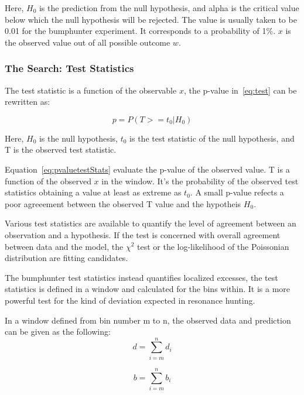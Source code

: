 Here, $H_0$ is the prediction from the null hypothesis, and alpha is the critical value below which the null hypothesis will be rejected. The value is usually taken to be 0.01 for the bumphunter experiment. It corresponds to a probability of 1\%. $x$ is the observed value out of all possible outcome $w$.  

\subsubsection{The Search: Test Statistics}
\label{teststatistics}

The test statistic is a function of the observable $x$, the p-value in~\ref{eq:test} can be rewritten as:
    
\begin{equation}
    p = P(T>=t_{0}| H_{0})
\label{eq:pvaluetestStats}
\end{equation}

Here, $H_0$ is the null hypothesis, $t_0$ is the test statistic of the null hypothesis, and T is the observed test statistic.

Equation~\ref{eq:pvaluetestStats} evaluate the p-value of the observed value. T is a function of the observed $x$ in the window. It's the probability of the observed test statistics obtaining a value at least as extreme as $t_{0}$. A small p-value refects a poor agreeement between the observed T value and the hypotheis $H_{0}$.

Various test statistics are available to quantify the level of agreement between an observation and a hypothesis. If the test is concerned with overall agreement between data and the model, the $\chi^{2}$ test or the log-likelihood of the Poissonian distribution are fitting candidates.

The bumphunter test statistics instead quantifies localized excesses, the test statistics is defined in a window and calculated for the bins within. It is a more powerful test for the kind of deviation expected in resonance hunting.

In a window defined from bin number m to n, the observed data and prediction can be given as the following: 
    \begin{equation}
         d= \sum_{i=m}^{n} d_i 
    \end{equation}

    
    \begin{equation}
         b= \sum_{i=m}^{n} b_i
    \end{equation}

